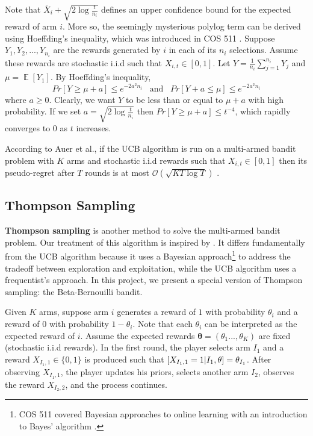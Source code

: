 \documentclass[12pt]{article}
\let\Pr\relax
\DeclareMathOperator*{\Pr}{\mathbb{P}}
\DeclareMathOperator*{\E}{\mathbb{E}}
\begin{document}
Note that $\bar{X}_{i}+\sqrt{2\log\frac{t}{n_{i}}}$ defines an upper confidence bound for the expected reward of arm $i$. More so, the seemingly mysterious polylog term can be derived using Hoeffding's inequality, which was introduced in COS 511 \cite{lecture8}. Suppose $Y_{1},Y_{2},...,Y_{n_{i}}$ are the rewards generated by $i$ in each of its $n_{i}$ selections. Assume these rewards are stochastic i.i.d such that $X_{i,t}\in[0,1]$. Let $Y=\frac{1}{n_{i}}\sum_{j=1}^{n_{i}}Y_{j}$ and $\mu=\E[Y_{1}]$. By Hoeffding's inequality, 
\begin{equation} 
Pr[Y\geq\mu+a]\leq e^{-2a^2 n_{i}}\,\,\,\text{ and }\,\,\,Pr[Y+a\leq\mu]\leq e^{-2a^2 n_{i}}
\end{equation}
where $a\geq 0$. Clearly, we want $Y$ to be less than or equal to $\mu+a$ with high probability. If we set $a=\sqrt{2\log\frac{t}{n_{i}}}$ then $Pr[Y \geq\mu+a]\leq t^{-4}$, which rapidly converges to $0$ as $t$ increases.

According to Auer et al., if the UCB algorithm is run on a multi-armed bandit problem with $K$ arms and stochastic i.i.d rewards such that $X_{i,t}\in[0,1]$ then its pseudo-regret after $T$ rounds is at most $\mathcal{O}(\sqrt{KT\log T})$ \cite{auer2002}.

\subsection{Thompson Sampling}

\textbf{Thompson sampling} \cite{thompson1933} is another method to solve the multi-armed bandit problem. Our treatment of this algorithm is inspired by \cite{russo2018}. It differs fundamentally from the UCB algorithm because it uses a Bayesian approach\footnote{COS 511 covered Bayesian approaches to online learning with an introduction to Bayes' algorithm \cite{lecture21}.} to address the tradeoff between exploration and exploitation, while the UCB algorithm uses a frequentist's approach. In this project, we present a special version of Thompson sampling: the Beta-Bernouilli bandit.

Given $K$ arms, suppose arm $i$ generates a reward of $1$ with probability $\theta_{i}$ and a reward of $0$ with probability $1-\theta_{i}$. Note that each $\theta_{i}$ can be interpreted as the expected reward of $i$. Assume the expected rewards $\boldsymbol{\theta}=(\theta_{1}...,\theta_{K})$ are fixed (stochastic i.i.d rewards). In the first round, the player selects arm $I_{1}$ and a reward $X_{I_{1},1}\in\{0,1\}$ is produced such that $\Pr[X_{I_{1},1}=1|I_{1},\mathbf{\theta}]=\theta_{I_{1}}$. After observing $X_{I_{1},1}$, the player updates his priors, selects another arm $I_{2}$, observes the reward $X_{I_{2},2}$, and the process continues.
\end{document}
